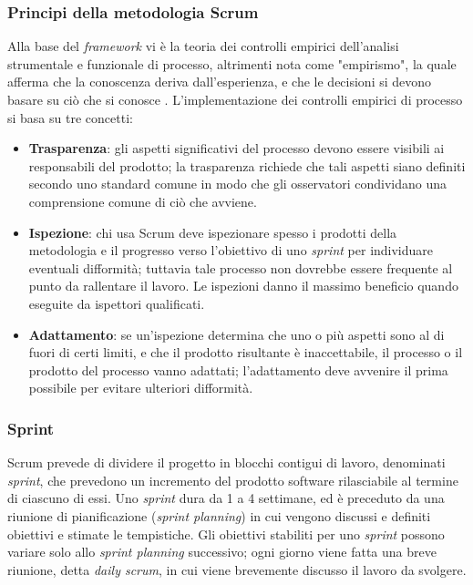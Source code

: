 \subsubsection{Principi della metodologia Scrum}
Alla base del \textit{framework} vi è la teoria dei controlli empirici dell'analisi strumentale e funzionale di processo, altrimenti nota come "empirismo", la quale afferma che la conoscenza deriva dall'esperienza, e che le decisioni si devono basare su ciò che si conosce \cite{scrum}. L'implementazione dei controlli empirici di processo si basa su tre concetti:
\begin{itemize}
    \item \textbf{Trasparenza}: gli aspetti significativi del processo devono essere visibili ai responsabili del prodotto; la trasparenza richiede che tali aspetti siano definiti secondo uno standard comune in modo che gli osservatori condividano una comprensione comune di ciò che avviene.
    \item \textbf{Ispezione}: chi usa Scrum deve ispezionare spesso i prodotti della metodologia e il progresso verso l'obiettivo di uno \textit{sprint} per individuare eventuali difformità; tuttavia tale processo non dovrebbe essere frequente al punto da rallentare il lavoro. Le ispezioni danno il massimo beneficio quando eseguite da ispettori qualificati.
    \item \textbf{Adattamento}: se un'ispezione determina che uno o più aspetti sono al di fuori di certi limiti, e che il prodotto risultante è inaccettabile, il processo o il prodotto del processo vanno adattati; l'adattamento deve avvenire il prima possibile per evitare ulteriori difformità.
\end{itemize}
\vspace{-12pt}
\subsubsection{Sprint}
Scrum prevede di dividere il progetto in blocchi contigui di lavoro, denominati \textit{sprint}, che prevedono un incremento del prodotto software rilasciabile al termine di ciascuno di essi.
Uno \textit{sprint} dura da 1 a 4 settimane, ed è preceduto da una riunione di pianificazione (\textit{sprint planning}) in cui vengono discussi e definiti obiettivi e stimate le tempistiche. Gli obiettivi stabiliti per uno \textit{sprint} possono variare solo allo \textit{sprint planning} successivo; ogni giorno viene fatta una breve riunione, detta \textit{daily scrum}, in cui viene brevemente discusso il lavoro da svolgere.

